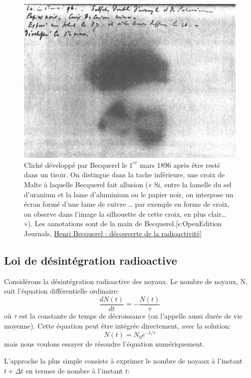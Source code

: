 \documentclass[%
oneside,                 %
final,                   %
10pt]{article}
\begin{document}
\begin{figure}[!ht]  %
  \centerline{\includegraphics[width=0.7\linewidth]{imgs/radioactivite.jpg}}
  \caption{
  Cliché développé par Becquerel le $1^{er}$ mars 1896 après être resté dans un tiroir. On distingue dans la tache inférieure, une croix de Malte à laquelle Becquerel fait allusion (« Si, entre la lamelle du sel d’uranium et la lame d’aluminium ou le papier noir, on interpose un écran formé d’une lame de cuivre … par exemple en forme de croix, on observe dans l’image la silhouette de cette croix, en plus clair… »). Les annotations sont de la main de Becquerel.[s:OpenEdition Journals, \href{{https://journals.openedition.org/bibnum/848}}{Henri Becquerel : découverte de la radioactivité}] \label{fig:Becquerel}
  }
\end{figure}


\subsection{Loi de désintégration radioactive}
Considérons la désintégration radioactive des noyaux. Le nombre de noyaux, N, suit l'équation différentielle ordinaire:
\begin{equation}
\frac{dN(t)}{dt} = - \frac{N(t)}{\tau}
\label{eq:desintegration_ode}
\end{equation}
où $\tau$ est la constante de temps de décroissance (on l'appelle aussi durée de vie moyenne). Cette équation peut être intégrée directement, avec la solution:
\begin{equation}
N(t) = N_0 e^{-t/\tau}
\label{eq:desintegration_exact}
\end{equation}
mais nous voulons essayer de résoudre l'équation numériquement.

L'approche la plus simple consiste à exprimer le nombre de noyaux à l'instant $t + \Delta t$ en termes de nombre à l'instant $t$:
\end{document}
